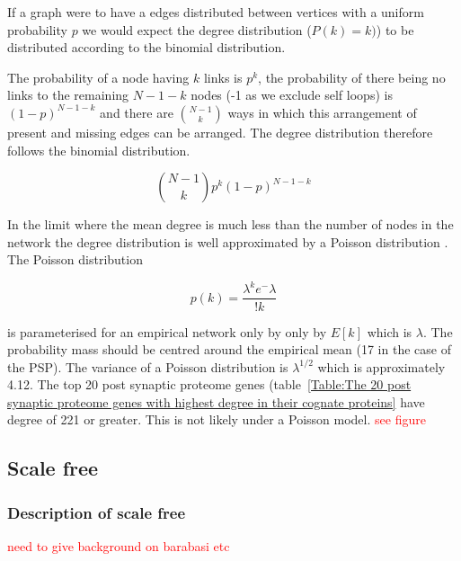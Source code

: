 If a graph were to have a  edges distributed between vertices with a uniform probability $p$ we would expect the degree distribution ($P(k)=k)$) to be distributed according to the binomial distribution.  

 The probability of a node having $k$ links is $p^k$, the probability of there being no links to the remaining $N-1-k$ nodes (-1 as we exclude self loops) is $(1-p)^{N-1-k}$ and there are $\binom{N-1}{k}$ ways in which this arrangement of present and missing edges can be arranged. The degree distribution therefore follows the binomial distribution.\cite{barabasi2016network}

\begin{equation}
   \binom{N-1}{k}        p^k (1-p)^{N-1-k}
   \label{Equation:BinomialDistributionForDegreeProbability}
\end{equation}

In the limit where the mean degree is much less than the number of nodes in the network the degree distribution is well approximated by a Poisson distribution \cite{barabasi2016network}. The Poisson distribution

\begin{equation}
    p(k) = \frac{\lambda^k e ^-\lambda}{!k}
\end{equation}

is parameterised for an empirical network only by only by $E[k]$ which is $\lambda$.  The probability mass should be centred around the empirical mean  (17 in the case of the PSP). The variance of a Poisson distribution is $\lambda^{1/2}$ which is approximately 4.12. The top 20 post synaptic proteome genes (table~\ref{Table:The 20 post synaptic proteome genes with highest degree in their cognate proteins} have degree of 221 or greater.  This is not likely under a Poisson model.   
 \textcolor{red}{see figure}


\subsection{Scale free}
\label{sec:scale_free}
\subsubsection{Description of scale free}

\textcolor{red}{need to give background on barabasi etc}

